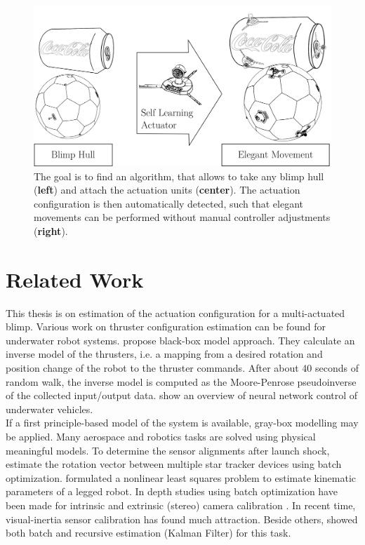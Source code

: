 \begin{figure}[hbtp]
\captionsetup{width=0.9\textwidth}
\centering
\includegraphics[width=.85\linewidth]{images/intro/motivation.png}
\caption{The goal is to find an algorithm, that allows to take any blimp hull (\textbf{left}) and attach the actuation units (\textbf{center}).
The actuation configuration is then automatically detected, such that elegant movements can be performed without manual controller adjustments (\textbf{right}).}
\label{fig:motivation}
\end{figure}

\section{Related Work}
\label{sec:rel_work}
This thesis is on estimation of the actuation configuration for a multi-actuated blimp. 
Various work on thruster configuration estimation can be found for underwater robot systems.
 propose black-box model approach.
They calculate an inverse model of the thrusters, i.e. a mapping from a desired rotation and position change of the robot to the thruster commands. After about 40 seconds of random walk, the inverse model is computed as the Moore-Penrose pseudoinverse of the collected input/output data.
 show an overview of neural network control of underwater vehicles. \\ 
If a first principle-based model of the system is available, gray-box modelling may be applied.
Many aerospace and robotics tasks are solved using physical meaningful models.
To determine the sensor alignments after launch shock, \citet{Shuster1991} estimate the rotation vector between multiple star tracker devices using batch optimization.
 formulated a nonlinear least squares problem to estimate kinematic parameters of a legged robot.
In depth studies using batch optimization have been made for intrinsic and extrinsic (stereo) camera calibration \citep[chap. 4]{Siegwart}.
In recent time, visual-inertia sensor calibration has found much attraction.
Beside others, \citet{Hol2011} showed both batch and recursive estimation (Kalman Filter) for this task.

